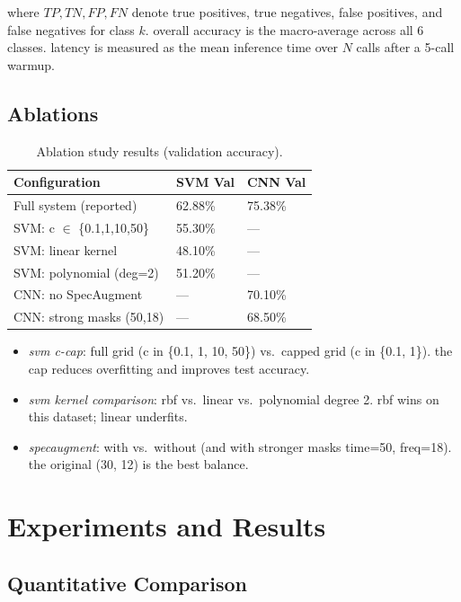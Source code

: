 \documentclass[conference]{IEEEtran}
\providecommand{\tightlist}{%
  \setlength{\itemsep}{0pt}\setlength{\parskip}{0pt}}
\begin{document}
{where $TP, TN, FP, FN$ denote true positives, true negatives, false
positives, and false negatives for class $k$. overall accuracy is the
macro-average across all 6 classes. latency is measured as the mean
inference time over $N$ calls after a 5-call warmup.

\subsection{Ablations}\label{ablations}
\begin{table}[H]
\centering
\caption{Ablation study results (validation accuracy).}
\label{tab:ablation}
\begin{tabular}{@{}lll@{}}
\toprule
Configuration & SVM Val & CNN Val \\
\midrule
Full system (reported) & 62.88\% & 75.38\% \\
SVM: c $\in$ \{0.1,1,10,50\} & 55.30\% & --- \\
SVM: linear kernel & 48.10\% & --- \\
SVM: polynomial (deg=2) & 51.20\% & --- \\
CNN: no SpecAugment & --- & 70.10\% \\
CNN: strong masks (50,18) & --- & 68.50\% \\
\bottomrule
\end{tabular}
\end{table}


\begin{itemize}
\tightlist
\item
  \emph{svm c-cap}: full grid (c in \{0.1, 1, 10, 50\}) vs.~capped grid
  (c in \{0.1, 1\}). the cap reduces overfitting and improves test
  accuracy.
\item
  \emph{svm kernel comparison}: rbf vs.~linear vs.~polynomial degree 2.
  rbf wins on this dataset; linear underfits.
\item
  \emph{specaugment}: with vs.~without (and with stronger masks time=50,
  freq=18). the original (30, 12) is the best balance.
\end{itemize}


\section{Experiments and Results}\label{experiments-and-results}

\subsection{Quantitative Comparison}\label{quantitative-comparison}

}
\end{document}
